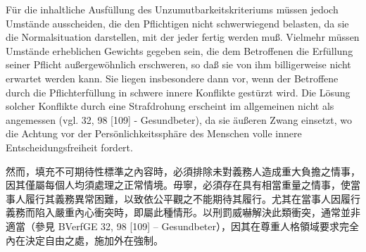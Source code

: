 \documentclass[12pt]{article}
\begin{document}
\syncleft
\begin{sourcepara}
Für die inhaltliche Ausfüllung des Unzumutbarkeitskriteriums müssen jedoch Umstände ausscheiden, die den Pflichtigen nicht schwerwiegend belasten, da sie die Normalsituation darstellen, mit der jeder fertig werden muß. Vielmehr müssen Umstände erheblichen Gewichts gegeben sein, die dem Betroffenen die Erfüllung seiner Pflicht außergewöhnlich erschweren, so daß sie von ihm billigerweise nicht erwartet werden kann. Sie liegen insbesondere dann vor, wenn der Betroffene durch die Pflichterfüllung in schwere innere Konflikte gestürzt wird. Die Lösung solcher Konflikte durch eine Strafdrohung erscheint im allgemeinen nicht als angemessen (vgl. \abbrBVerfGE{} 32, 98 [109] - Gesundbeter), da sie äußeren Zwang einsetzt, wo die Achtung vor der Persönlichkeitssphäre des Menschen volle innere Entscheidungsfreiheit fordert.
\end{sourcepara}
\begin{transpara}
然而，填充不可期待性標準之內容時，必須排除未對義務人造成重大負擔之情事，因其僅屬每個人均須處理之正常情境。毋寧，必須存在具有相當重量之情事，使當事人履行其義務異常困難，以致依公平觀之不能期待其履行。尤其在當事人因履行義務而陷入嚴重內心衝突時，即屬此種情形。以刑罰威嚇解決此類衝突，通常並非適當（參見 BVerfGE 32, 98 [109] -- Gesundbeter），因其在尊重人格領域要求完全內在決定自由之處，施加外在強制。
\end{transpara}
\end{document}
